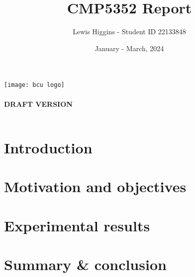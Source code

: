 \documentclass[12pt]{report}
\title{CMP5352 Report}
\author{Lewis Higgins - Student ID 22133848}
\date{January - March, 2024}
\begin{document}
    \pagecolor{yellow}

    \makeatletter
    \begin{titlepage}
        \begin{center}
            \texttt{[image: bcu logo]}\\[4ex]
            {\huge \bfseries  \@title }\\[2ex]
            {\huge \bfseries  DRAFT VERSION }\\[2ex]
            {\@author}\\[50ex]
            {\large \@date}
        \end{center}
    \end{titlepage}
    \makeatother
    \thispagestyle{empty}
    \newpage

    \pagecolor{white}

    \tableofcontents

    \chapter{Introduction}\label{ch:introduction}

    \chapter{Motivation and objectives}\label{ch:sec1}
    

    \chapter{Experimental results}\label{ch:sec2}
    

    \chapter{Summary \& conclusion}\label{ch:sec3}
    


    \printbibliography
\end{document}
